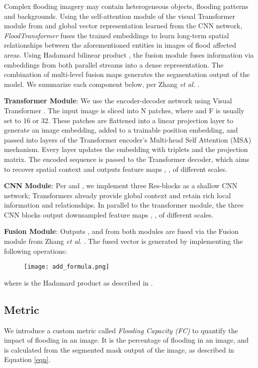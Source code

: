 \documentclass{article}
\begin{document}
Complex flooding imagery may contain heterogeneous objects, flooding patterns and backgrounds. Using the self-attention module of the visual Transformer module from  \cite{zhou2021deepvit} and global vector representation learned from the CNN network, \textit{FloodTransformer} fuses the trained embeddings to learn long-term spatial relationships between the aforementioned entities in images of flood affected areas. Using Hadamard bilinear product \cite{zhang2021transfuse}, the fusion module fuses information via embeddings from both parallel streams into a dense representation. The combination of multi-level fusion maps generates the segmentation output of the model. We summarize each component below, per Zhang \textit{et al.} \cite{zhang2021transfuse}. 

\textbf{Transformer Module}:
We use the encoder-decoder network using Visual Transformer \cite{zhou2021deepvit}. The input image  is sliced into N patches, where  and F is usually set to 16 or 32. These patches are flattened into a linear projection layer to generate an image embedding, added to a trainable position embedding, and passed into  layers of the Transformer encoder's Multi-head Self Attention (MSA) mechanism. Every layer updates the embedding with  triplets and the projection matrix. The encoded sequence  is passed to the Transformer decoder, which aims to recover spatial context and outputs feature maps , ,  of different scales.

\textbf{CNN Module}: Per \cite{zhang2021transfuse} and \cite{roytowards}, we implement three Res-blocks as a shallow CNN network; Transformers already provide global context and retain rich local information and relationships. In parallel to the transformer module, the three CNN blocks output downsampled feature maps , ,  of different scales.  

\textbf{Fusion Module}:
Outputs  ,  and  from both modules are fused via the Fusion module from Zhang \textit {et al}. \cite{zhang2021transfuse}. The fused vector  is generated by implementing the following operations: 


\begin{figure}[ht]
    \centering

    {{\texttt{[image: add\_formula.png]}}}\enskip
\label{fig:addImage}\end{figure}




where  is the Hadamard product as described in \cite{zhang2021transfuse}.  

\subsection{Metric}
We introduce a custom metric called \textit{Flooding Capacity (FC)} to quantify the impact of flooding in an image. It is the percentage of flooding in an image, and is calculated from the segmented mask output of the image, as described in Equation \ref{eqn}. 
\end{document}
